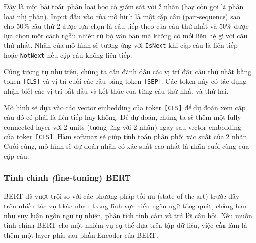 \begin{enumerate}
          Đây là một bài toán phân loại học có giám sát với 2 nhãn (hay còn gọi là phân loại nhị phân). Input đầu vào của mô hình là một cặp câu (pair-sequence) sao cho 50\% câu thứ 2 được lựa chọn là câu tiếp theo của câu thứ nhất và 50\% được lựa chọn một cách ngẫu nhiên từ bộ văn bản mà không có mối liên hệ gì với câu thứ nhất. Nhãn của mô hình sẽ tương ứng với {\tt {\small IsNext}} khi cặp câu là liên tiếp hoặc {\tt {\small NotNext}} nếu cặp câu không liên tiếp.

          Cũng tương tự như trên, chúng ta cần đánh dấu các vị trí đầu câu thứ nhất bằng token {\tt [CLS]} và vị trí cuối các câu bằng token {\tt [SEP]}. Các token này có tác dụng nhận biết các vị trí bắt đầu và kết thúc của từng câu thứ nhất và thứ hai.

          Mô hình sẽ dựa vào các vector embedding của token {\tt [CLS]} để dự đoán xem cặp câu đó có phải là liên tiếp hay không. Để dự đoán, chúng ta sẽ thêm một fully connected layer với 2 units (tương ứng với 2 nhãn) ngay sau vector embedding của token {\tt [CLS]}. Hàm softmax sẽ giúp tính toán phân phối xác suất của 2 nhãn. Cuối cùng, mô hình sẽ dự đoán nhãn có xác suất cao nhất là nhãn cuối cùng của cặp câu.
\end{enumerate}

\subsubsection{Tinh chỉnh \textit(fine-tuning) BERT}

BERT đã vượt trội so với các phương pháp tối ưu (state-of-the-art) trước đây trên nhiều tác vụ khác nhau trong lĩnh vực hiểu ngôn ngữ tổng quát, chẳng hạn như suy luận ngôn ngữ tự nhiên, phân tích tình cảm và trả lời câu hỏi.
Nếu muốn tinh chỉnh BERT cho một nhiệm vụ cụ thể dựa trên tập dữ liệu, việc cần làm là thêm một layer phía sau phần Encoder của BERT.

